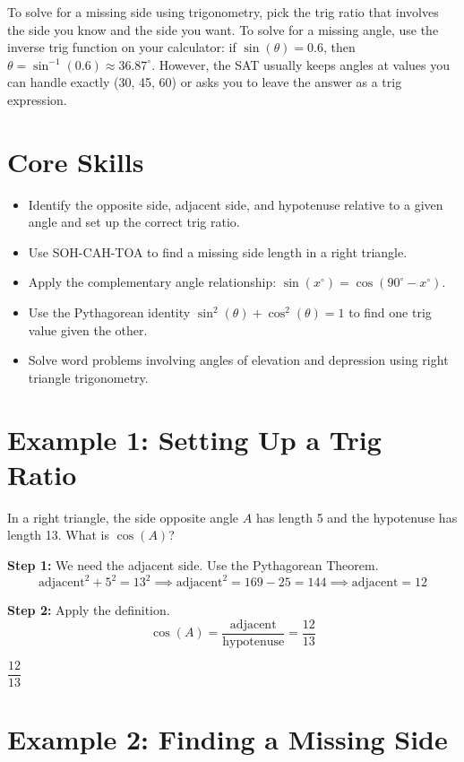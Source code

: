 \documentclass[14pt]{extarticle}
\begin{document}
To solve for a missing side using trigonometry, pick the trig ratio that involves the side you know and the side you want. To solve for a missing angle, use the inverse trig function on your calculator: if \(\sin(\theta) = 0.6\), then \(\theta = \sin^{-1}(0.6) \approx 36.87^\circ\). However, the SAT usually keeps angles at values you can handle exactly (30, 45, 60) or asks you to leave the answer as a trig expression.

\section*{Core Skills}
\begin{itemize}
  \item Identify the opposite side, adjacent side, and hypotenuse relative to a given angle and set up the correct trig ratio.
  \item Use SOH-CAH-TOA to find a missing side length in a right triangle.
  \item Apply the complementary angle relationship: \(\sin(x^\circ) = \cos(90^\circ - x^\circ)\).
  \item Use the Pythagorean identity \(\sin^2(\theta) + \cos^2(\theta) = 1\) to find one trig value given the other.
  \item Solve word problems involving angles of elevation and depression using right triangle trigonometry.
\end{itemize}

\section*{Example 1: Setting Up a Trig Ratio}

In a right triangle, the side opposite angle \(A\) has length 5 and the hypotenuse has length 13. What is \(\cos(A)\)?

\textbf{Step 1:} We need the adjacent side. Use the Pythagorean Theorem.
\[
\text{adjacent}^2 + 5^2 = 13^2 \implies \text{adjacent}^2 = 169 - 25 = 144 \implies \text{adjacent} = 12
\]

\textbf{Step 2:} Apply the definition.
\[
\cos(A) = \frac{\text{adjacent}}{\text{hypotenuse}} = \frac{12}{13}
\]

\(\boxed{\dfrac{12}{13}}\)

\section*{Example 2: Finding a Missing Side}
\end{document}
